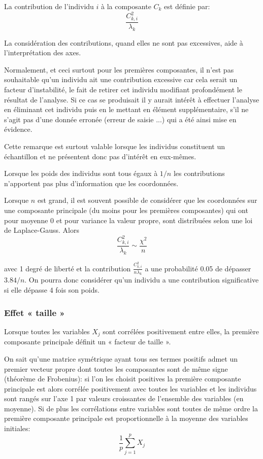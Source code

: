 \documentclass[12pt,a4paper]{article}
\begin{document}
La contribution de l'individu $i$ à la composante $C_k$ est définie par:
\[\frac{C_{k,i}^2}{\lambda_k}\]

La considération des contributions, quand elles ne sont pas excessives, aide à l'interprétation des axes.

Normalement, et ceci surtout pour les premières composantes, il n'est pas souhaitable
qu'un individu ait une contribution excessive car cela serait un facteur d'instabilité, le fait de
retirer cet individu modifiant profondément le résultat de l'analyse. Si ce cas se produisait il
y aurait intérêt à effectuer l'analyse en éliminant cet individu puis en le mettant en élément
supplémentaire, s'il ne s'agit pas d'une donnée erronée (erreur de saisie ...) qui a été ainsi
mise en évidence.

Cette remarque est surtout valable lorsque les individus constituent un échantillon et ne
présentent donc pas d'intérêt en eux-mêmes.

Lorsque les poids des individus sont tous égaux à $1/n$ les contributions n'apportent pas
plus d'information que les coordonnées.

Lorsque $n$ est grand, il est souvent possible de considérer que les coordonnées sur une composante principale (du moins pour les premières composantes) qui ont pour moyenne 0 et pour
variance la valeur propre, sont distribuées selon une loi de Laplace-Gauss. Alors
\[\frac{C_{k,i}^2}{\lambda_k} \sim \frac{\chi^2}{n}\]

avec 1 degré de liberté et la contribution $\frac{C_{k,i}^2}{n \lambda_k}$ a une probabilité 0.05 de dépasser
$3.84/n$. On pourra donc considérer qu'un individu a une contribution significative si elle
dépasse 4 fois son poids.

\subsubsection{Effet « taille »}

Lorsque toutes les variables $X_j$ sont corrélées positivement entre elles, la première composante principale définit un « facteur de taille ».

On sait qu'une matrice symétrique ayant tous ses termes positifs admet un premier vecteur
propre dont toutes les composantes sont de même signe (théorème de Frobenius): si l'on les choisit positives la première composante principale est alors corrélée positivement avec toutes
les variables et les individus sont rangés sur l'axe 1 par valeurs croissantes de l'ensemble des
variables (en moyenne). Si de plus les corrélations entre variables sont toutes de même ordre
la première composante principale est proportionnelle à la moyenne des variables initiales:
\[\frac{1}{p} \sum_{j=1}^p X_j\]
\end{document}
